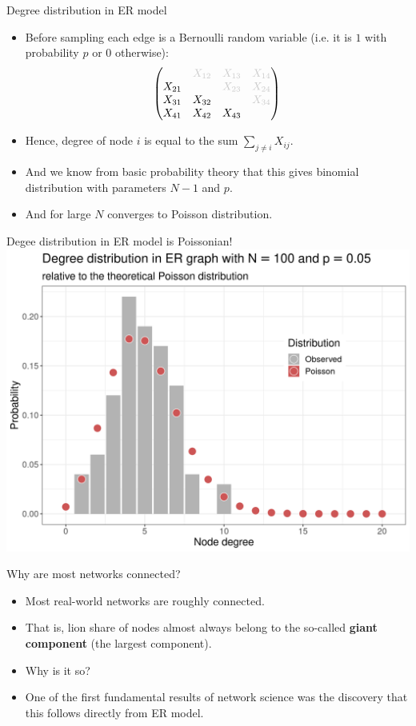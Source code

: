 \documentclass[
    hyperref={colorlinks,linkcolor=blue,urlcolor=blue,citecolor=blue}
]{beamer}
\newcommand{\gray}[1]{\textcolor{black!20}{#1}}
\begin{document}
\begin{frame}{Degree distribution in ER model}
\begin{itemize}
    \item<2-> Before sampling each edge is a Bernoulli random variable
    (i.e. it is $1$ with probability $p$ or $0$ otherwise):
    \[
        \begin{pmatrix}
             & \gray{X_{12}} & \gray{X_{13}} & \gray{X_{14}} \\
            X_{21} &  & \gray{X_{23}} & \gray{X_{24}} \\
            X_{31} & X_{32} &  & \gray{X_{34}} \\
            X_{41} & X_{42} & X_{43} &  \\
        \end{pmatrix}
    \]
    \item<3-> Hence, degree of node $i$ is equal to the sum $\sum_{j \neq i}X_{ij}$.
    \item<4-> And we know from basic probability theory that this gives binomial
    distribution with parameters $N-1$ and $p$.
    \item<5-> And for large $N$ converges to Poisson distribution.
\end{itemize}
\end{frame}

\begin{frame}{Degee distribution in ER model is Poissonian!}
\centering
\includegraphics[width=.8\textwidth]{overview/er-poisson-1}
\end{frame}

\begin{frame}{Why are most networks connected?}
\begin{itemize}
    \item<1-> Most real-world networks are roughly connected.
    \item<2-> That is, lion share of nodes almost always belong to
    the so-called \textbf{giant component} (the largest component).
    \item<3-> Why is it so?
    \item<4-> One of the first fundamental results of network science
    was the discovery that this follows directly from ER model.
\end{itemize}
\end{frame}
\end{document}
